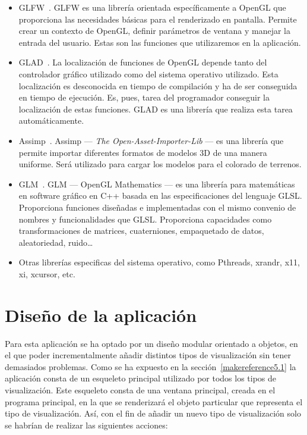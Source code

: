 \begin{itemize}
		\item GLFW~\cite{GLFW}. GLFW es una librería orientada específicamente a
				OpenGL que proporciona las necesidades básicas para el
				renderizado en pantalla. Permite crear un contexto de OpenGL,
				definir parámetros de ventana y manejar la entrada del usuario.
				Estas son las funciones que utilizaremos en la aplicación.
		\item GLAD~\cite{GLAD}. La localización de funciones de OpenGL depende
				tanto del controlador gráfico utilizado como del sistema
				operativo utilizado. Esta localización es desconocida en tiempo
				de  compilación y ha de ser conseguida en tiempo de ejecución.
				Es, pues, tarea del programador conseguir la localización de
				estas funciones. GLAD es una  librería que realiza esta tarea
				automáticamente.
		\item Assimp~\cite{ASSIMP}. Assimp --- \textit{The
				Open-Asset-Importer-Lib} --- es una librería que permite
				importar diferentes formatos de modelos 3D de una manera
				uniforme. Será utilizado para cargar los modelos para el
				colorado de terrenos.
		\item GLM~\cite{GLM}. GLM --- OpenGL Mathematics --- es una librería
				para matemáticas en software gráfico en C++ basada en las
				especificaciones del lenguaje GLSL. Proporciona funciones
				diseñadas e implementadas con el mismo convenio de nombres y
				funcionalidades que GLSL. Proporciona capacidades como
				transformaciones de matrices, cuaterniones, empaquetado de
				datos, aleatoriedad, ruido\ldots
		\item Otras librerías especificas del sistema operativo, como Pthreads,
				xrandr, x11, xi, xcursor, etc.
\end{itemize}

\section{Diseño de la aplicación}
\label{makereference5.3}

Para esta aplicación se ha optado por un diseño modular orientado a objetos, en
el que poder incrementalmente añadir distintos tipos de visualización sin tener
demasiados problemas. Como se ha expuesto en la sección~\ref{makereference5.1}
la aplicación consta de un esqueleto principal utilizado por todos los tipos de
visualización. Este esqueleto consta de una ventana principal, creada en el
programa principal, en la que se renderizará el objeto particular que representa
el tipo de visualización. Así, con el fin de añadir un nuevo tipo de
visualización solo se habrían de realizar las siguientes acciones:

